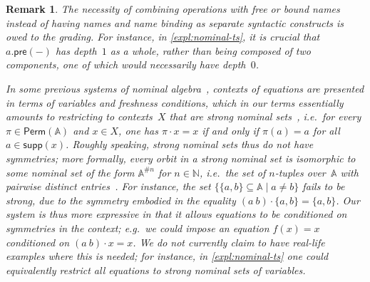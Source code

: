 \documentclass[11pt,a4paper]{amsart}
\newtheorem{remark}[remark]{Remark}
\newcommand{\Perm}{\mathsf{Perm}(\Names)}
\newcommand{\pre}{\mathsf{pre}}
\newcommand{\Names}{\mathbb{A}}
\newcommand{\fresh}{\mathbin{\#}}
\newcommand{\supp}{\mathsf{supp}}
\theoremstyle{plain}
\numberwithin{equation}{section}
\newcommand{\Nat}{{\mathbb{N}}}
\newcommand{\Set}{\mathbf{Set}}
\newcommand{\+}[1]{\mathcal{#1}\xspace}
\newcommand{\Nom}{\mathbf{Nom}}
\theoremstyle{definition}
\begin{document}
\begin{remark}\label{rem:expressiveness}
  The necessity of combining operations with free or bound names
  instead of having names and name binding as separate syntactic
  constructs is owed to the grading. For instance, in
  \cref{expl:nominal-ts}, it is crucial that $a.\pre(-)$ has
  depth~$1$ as a whole, rather than being composed of two components,
  one of which would necessarily have depth~$0$.

  In some previous systems of nominal
  algebra~\cite{Gabbay09,GabbayMathijssen09}, contexts of equations
  are presented in terms of variables and freshness conditions, which
  in our terms essentially amounts to restricting to contexts~$X$ that
  are \emph{strong} nominal sets~\cite{TzevelekosThesis}, i.e.~for
  every $\pi\in \Perm$ and $x\in X$, one has $\pi\cdot x = x$ if and
  only if $\pi(a)=a$ for all $a\in \supp(x)$. %
  Roughly speaking, strong nominal sets thus do not have symmetries;
  more formally, every orbit in a strong nominal set is isomorphic to
  some nominal set of the form $\Names^{\fresh n}$ for $n\in\Nat$,
  i.e.~the set of $n$-tuples over~$\Names$ with pairwise distinct
  entries~\cite[Lemma~2.4.2]{Petrisan11}. For instance, the set
  $\{\{a,b\}\subseteq\Names\mid a\neq b\}$ fails to be strong, due to
  the symmetry embodied in the equality
  $(a\ b)\cdot\{a,b\}=\{a,b\}$. Our system is thus more expressive in
  that it allows equations to be conditioned on symmetries in the
  context; e.g.~we could impose an equation $f(x)=x$ conditioned on
  $(a\ b)\cdot x=x$. We do not currently claim to have real-life
  examples where this is needed; for instance, in
  \cref{expl:nominal-ts} one could equivalently restrict all equations
  to strong nominal sets of variables.

\end{remark}
\end{document}
